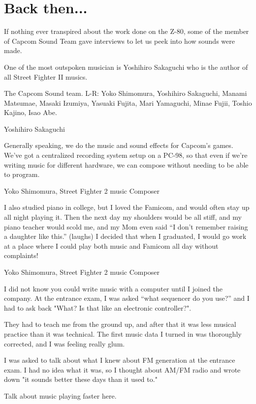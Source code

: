 \section{Back then...}
If nothing ever transpired about the work done on the Z-80, some of the member of Capcom Sound Team gave interviews to let us peek into how sounds were made.

One of the most outspoken musician is Yoshihiro Sakaguchi who is the author of all Street Fighter II musics.


The Capcom Sound team. L-R: Yoko Shimomura, Yoshihiro Sakaguchi, Manami Matsumae, Masaki Izumiya, Yasuaki Fujita, Mari Yamaguchi, Minae Fujii, Toshio Kajino, Isao Abe.

\begin{q}{Yoshihiro Sakaguchi\cite{yoko_shimomura_interview}  }

Generally speaking, we do the music and sound effects for Capcom’s games. We’ve got a centralized recording system setup on a PC-98, so that even if we’re writing music for different hardware, we can compose without needing to be able to program.
\end{q}

\begin{q}{Yoko Shimomura, Street Fighter 2 music Composer\cite{beep199010}}

I also studied piano in college, but I loved the Famicom, and would often stay up all night playing it. Then the next day my shoulders would be all stiff, and my piano teacher would scold me, and my Mom even said “I don’t remember raising a daughter like this.” (laughs) I decided that when I graduated, I would go work at a place where I could play both music and Famicom all day without complaints!
\end{q}

\begin{q}{Yoko Shimomura, Street Fighter 2 music Composer\cite{beep199010}}
  
I did not know you could write music with a computer until I joined the company. At the entrance exam, I was asked “what sequencer do you use?” and I had to ask back "What? Is that like an electronic controller?".

They had to teach me from the ground up, and after that it was less musical practice than it was technical. The first music data I turned in was thoroughly corrected, and I was feeling really glum.

I was asked to talk about what I knew about FM generation at the entrance exam. I had no idea what it was, so I thought about AM/FM radio and wrote down "it sounds better these days than it used to."
\end{q}


\begin{trivia}
Talk about music playing faster here.
\end{trivia}
